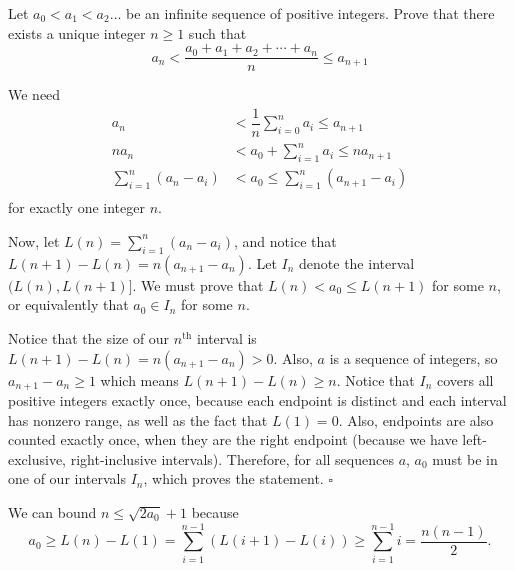 
\begin{problem}[ISL 2014 A1]
    Let $a_0 < a_1 < a_2 \ldots$ be an infinite sequence of positive integers.
    Prove that there exists a unique integer $n\geq 1$ such that
    \[a_n < \frac{a_0+a_1+a_2+\cdots+a_n}{n} \leq a_{n+1}\]
\end{problem}

\begin{solution}[Ritwin]
    We need \begin{align*}
    a_n &< \dfrac1n\sum_{i=0}^na_i \leq a_{n+1}\\
    na_n &< a_0+\sum_{i=1}^na_i \leq na_{n+1}\\
    \sum_{i=1}^n(a_n-a_i) &< a_0 \leq \sum_{i=1}^n(a_{n+1}-a_i)\\
    \end{align*}
    for exactly one integer $n$.
    
    Now, let $L(n) = \sum_{i=1}^n(a_n-a_i)$, and notice that $L(n+1)-L(n)=n(a_{n+1}-a_n)$.
    Let $I_n$ denote the interval $(L(n), L(n+1)]$. We must prove that
    $L(n) < a_0 \leq L(n+1)$ for some $n$, or equivalently that $a_0 \in I_n$ for some $n$.
    
    Notice that the size of our $n^\textrm{th}$ interval is $L(n+1)-L(n) = n(a_{n+1}-a_n) > 0$.
    Also, $a$ is a sequence of integers, so $a_{n+1}-a_n \geq 1$ which means
    $L(n+1)-L(n) \geq n$. Notice that $I_n$ covers all positive integers exactly
    once, because each endpoint is distinct and each interval has nonzero range,
    as well as the fact that $L(1)=0$. Also, endpoints are also counted exactly
    once, when they are the right endpoint (because we have left-exclusive,
    right-inclusive intervals). Therefore, for all sequences $a$, $a_0$ must be
    in one of our intervals $I_n$, which proves the statement. $\square$
    
    \begin{remark}
        We can bound $n \leq \sqrt{2a_0}+1$ because
        \[a_0 \geq L(n)-L(1) = \sum_{i=1}^{n-1} (L(i+1)-L(i)) \geq \sum_{i=1}^{n-1} i = \frac{n(n-1)}{2}.\]
    \end{remark}
\end{solution}
